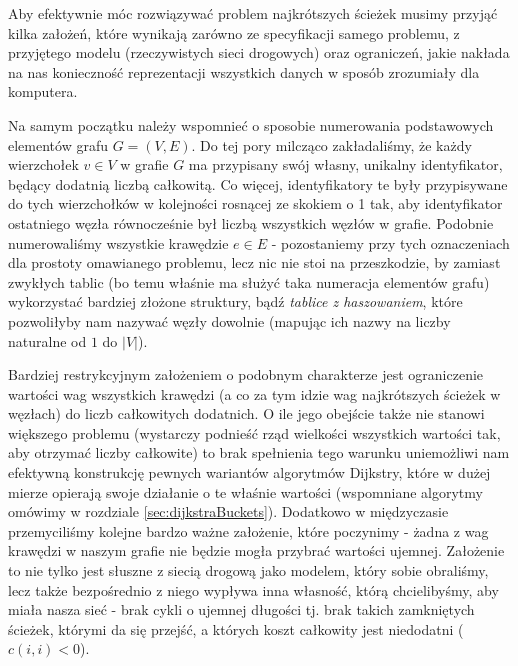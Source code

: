 Aby efektywnie móc rozwiązywać problem najkrótszych ścieżek musimy przyjąć kilka założeń, które wynikają zarówno ze specyfikacji samego problemu, z przyjętego modelu (rzeczywistych sieci drogowych) oraz ograniczeń, jakie nakłada na nas konieczność reprezentacji wszystkich danych w sposób zrozumiały dla komputera.

Na samym początku należy wspomnieć o sposobie numerowania podstawowych elementów grafu $G = \left( V, E \right)$. Do tej pory milcząco zakładaliśmy, że każdy wierzchołek $v \in V$ w grafie $G$ ma przypisany swój własny, unikalny identyfikator, będący dodatnią liczbą całkowitą. Co więcej, identyfikatory te były przypisywane do tych wierzchołków w kolejności rosnącej ze skokiem o 1 tak, aby identyfikator ostatniego węzła równocześnie był liczbą wszystkich węzłów w grafie. Podobnie numerowaliśmy wszystkie krawędzie $e \in E$ - pozostaniemy przy tych oznaczeniach dla prostoty omawianego problemu, lecz nic nie stoi na przeszkodzie, by zamiast zwykłych tablic (bo temu właśnie ma służyć taka numeracja elementów grafu) wykorzystać bardziej złożone struktury, bądź \textit{tablice z haszowaniem}, które pozwoliłyby nam nazywać węzły dowolnie (mapując ich nazwy na liczby naturalne od $1$ do $ \left| V \right| $).

Bardziej restrykcyjnym założeniem o podobnym charakterze jest ograniczenie wartości wag wszystkich krawędzi (a co za tym idzie wag najkrótszych ścieżek w węzłach) do liczb całkowitych dodatnich. O ile jego obejście także nie stanowi większego problemu (wystarczy podnieść rząd wielkości wszystkich wartości tak, aby otrzymać liczby całkowite) to brak spełnienia tego warunku uniemożliwi nam efektywną konstrukcję pewnych wariantów algorytmów Dijkstry, które w dużej mierze opierają swoje działanie o te właśnie wartości (wspomniane algorytmy omówimy w rozdziale \ref{sec:dijkstraBuckets}). Dodatkowo w międzyczasie przemyciliśmy kolejne bardzo ważne założenie, które poczynimy - żadna z wag krawędzi w naszym grafie nie będzie mogła przybrać wartości ujemnej. Założenie to nie tylko jest słuszne z siecią drogową jako modelem, który sobie obraliśmy, lecz także bezpośrednio z niego wypływa inna własność, którą chcielibyśmy, aby miała nasza sieć - brak cykli o ujemnej długości tj. brak takich zamkniętych ścieżek, którymi da się przejść, a których koszt całkowity jest niedodatni ($ c \left( i, i \right) < 0 $). 


